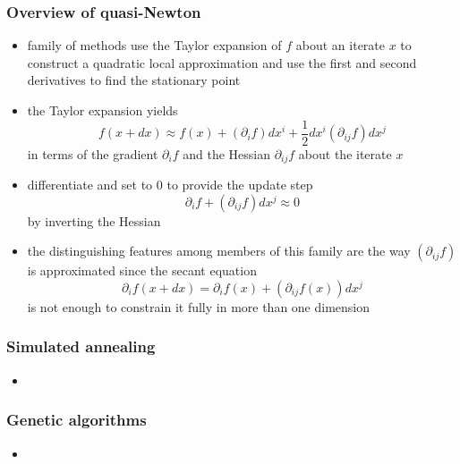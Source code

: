 \begin{frame}[fragile]
%
  \frametitle{Overview of quasi-Newton}
%
  \begin{itemize}
%
    \item family of methods use the Taylor expansion of $f$ about an iterate $x$ to construct a
      quadratic local approximation and use the first and second derivatives to find the
      stationary point
%
    \item the Taylor expansion yields
      \begin{equation}
        f(x+dx) 
        \approx 
        f(x) 
        + (\partial_{i} f) dx^{i} 
        + \frac{1}{2} dx^{i} (\partial_{ij} f) dx^{j}
    \end{equation}
    in terms of the gradient $\partial_{i} f$ and the Hessian $\partial_{ij} f$ about the
    iterate $x$
% 
  \item differentiate and set to 0 to provide the update step
    \begin{equation}
      \partial_{i} f + (\partial_{ij} f) dx^{j} \approx 0
    \end{equation}
    by inverting the Hessian
%
    \item the distinguishing features among members of this family are the way $(\partial_{ij}
      f)$ is approximated since the secant equation
      \begin{equation}
        \partial_{i} f(x+dx) = \partial_{i} f(x) + (\partial_{ij} f(x)) dx^{j}
      \end{equation}
      is not enough to constrain it fully in more than one dimension
% 
  \end{itemize}
% 
\end{frame}

\begin{frame}[fragile]
%
  \frametitle{Simulated annealing}
%
  \begin{itemize}
  \item 
  \end{itemize}
%
\end{frame}


\begin{frame}[fragile]
%
  \frametitle{Genetic algorithms}
%
  \begin{itemize}
  \item 
  \end{itemize}
%
\end{frame}



